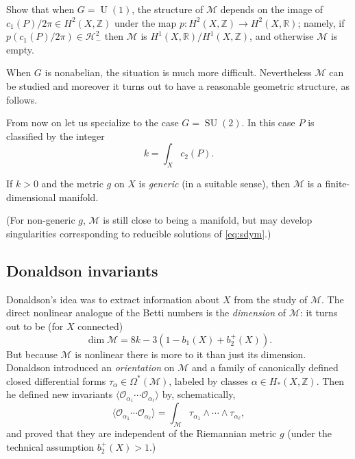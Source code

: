 \documentclass[12pt,letterpaper,reqno]{article}
\numberwithin{equation}{section}
\newcommand{\cM}{\ensuremath{\mathcal M}}
\newcommand{\cO}{\ensuremath{\mathcal O}}
\newcommand{\cH}{\ensuremath{\mathcal H}}
\newcommand{\R}{\ensuremath{\mathbb R}}
\newcommand{\Z}{\ensuremath{\mathbb Z}}
\newcommand{\IP}[1]{\langle#1\rangle}
\newcommand{\ti}[1]{\textit{#1}}
\DeclareMathOperator{\SU}{SU}
\DeclareMathOperator{\U}{U}
\newcommand{\fixme}[1]{{\color{orange}{[#1]}}}
\begin{document}
\begin{exercise}
Show that when $G = \U(1)$, the structure of $\cM$ depends on
the image of $c_1(P)/2\pi \in H^2(X,\Z)$ under the map
$p: H^2(X,\Z) \to H^2(X,\R)$; namely, if $p(c_1(P)/2\pi) \in \cH^2_-$
then $\cM$ is $H^1(X,\R) / H^1(X,\Z)$, and otherwise $\cM$ is empty.
\fixme{warning: needs Hodge theory}
\fixme{warning: I got this wrong twice already, hopefully it's right now}
\end{exercise}

When $G$ is nonabelian, the situation is much more difficult.
Nevertheless $\cM$ can be studied and moreover it turns out to have a 
reasonable geometric structure, as follows.

From now on let us specialize to the case $G = \SU(2)$.
In this case $P$ is classified by the integer
\begin{equation}
  k = \int_X c_2(P).
\end{equation}

\begin{fact}
If $k>0$ and the metric $g$ on $X$ is \ti{generic} (in a suitable sense), 
then $\cM$ is a finite-dimensional manifold.
\end{fact}
(For non-generic $g$, $\cM$ is still close to being a manifold, but 
may develop singularities corresponding
to reducible solutions of \eqref{eq:sdym}.)


\subsection{Donaldson invariants}

Donaldson's idea was to extract information about $X$ from
the study of $\cM$. The direct nonlinear analogue of the Betti numbers is the
\ti{dimension} of $\cM$: it turns out to be (for $X$ connected)
\begin{equation}
  \dim \cM = 8k - 3 (1 - b_1(X) + b_2^+(X)).
\end{equation}
But because $\cM$ is nonlinear there is more to it than just its dimension.
Donaldson introduced an \ti{orientation} on $\cM$
and a family of canonically defined
closed differential forms $\tau_\alpha \in \Omega^*(\cM)$,
labeled by classes $\alpha \in H_*(X,\Z)$.
Then he defined new invariants $\IP{\cO_{\alpha_1} \cdots \cO_{\alpha_\ell}}$
by, schematically,
\begin{equation} \label{eq:donaldson-integral}
  \IP{\cO_{\alpha_1} \cdots \cO_{\alpha_\ell}} = \int_\cM \tau_{\alpha_1} \wedge \cdots \wedge \tau_{\alpha_\ell},
\end{equation}
and proved that they are independent of the Riemannian metric
$g$ (under the technical
assumption $b_2^+(X) > 1$.)
\end{document}

